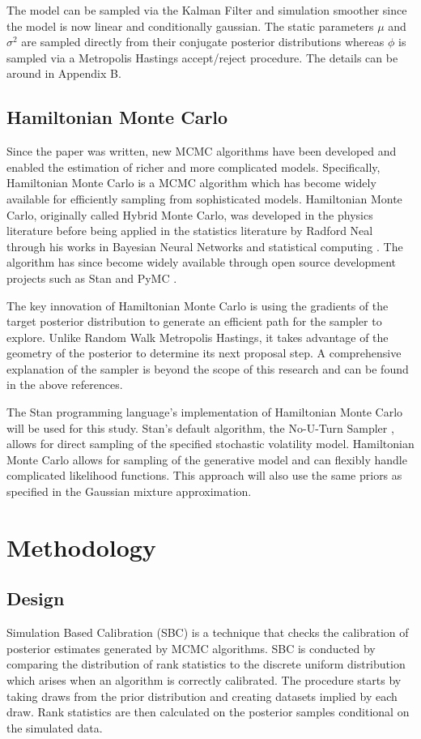 \documentclass[12pt, a4paper]{article}
\begin{document}
        The model can be sampled via the Kalman Filter and simulation smoother since the model is now linear and conditionally gaussian. The static parameters $\mu$ and $\sigma^2$ are sampled directly from their conjugate posterior distributions whereas $\phi$ is sampled via a Metropolis Hastings accept/reject procedure. The details can be around in Appendix B. 

    \subsection{Hamiltonian Monte Carlo}
        Since the paper was written, new MCMC algorithms have been developed and enabled the estimation of richer and more complicated models. Specifically, Hamiltonian Monte Carlo is a MCMC algorithm which has become widely available for efficiently sampling from sophisticated models. Hamiltonian Monte Carlo, originally called Hybrid Monte Carlo, was developed in the physics literature \citep{duane1987hybrid} before being applied in the statistics literature by Radford Neal through his works in Bayesian Neural Networks \citep{neal1995bayesian} and statistical computing \citep{neal2011mcmc}. The algorithm has since become widely available through open source development projects such as Stan \citep{stan} and PyMC \citep{pymc2023}.

        The key innovation of Hamiltonian Monte Carlo is using the gradients of the target posterior distribution to generate an efficient path for the sampler to explore. Unlike Random Walk Metropolis Hastings, it takes advantage of the geometry of the posterior to determine its next proposal step. A comprehensive explanation of the sampler is beyond the scope of this research and can be found in the above references. 

        The Stan programming language's implementation of Hamiltonian Monte Carlo will be used for this study. Stan's default algorithm, the No-U-Turn Sampler \citep{hoffman2014no}, allows for direct sampling of the specified stochastic volatility model. Hamiltonian Monte Carlo allows for sampling of the generative model and can flexibly handle complicated likelihood functions. This approach will also use the same priors as specified in the Gaussian mixture approximation.


\section{Methodology}

    \subsection{Design}
        Simulation Based Calibration (SBC) is a technique that checks the calibration of posterior estimates generated by MCMC algorithms. SBC is conducted by comparing the distribution of rank statistics to the discrete uniform distribution which arises when an algorithm is correctly calibrated. The procedure starts by taking draws from the prior distribution and creating datasets implied by each draw. Rank statistics are then calculated on the posterior samples conditional on the simulated data. 
\end{document}
